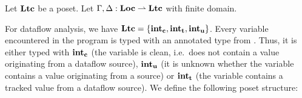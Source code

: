 Let $\textbf{Ltc}$ be a poset.
Let $\Gamma, \Delta: \textbf{Loc} \rightharpoonup \textbf{Ltc}$ with finite domain.

For dataflow analysis, we have $\textbf{Ltc} = \{\textbf{int}_\textbf{c}, \textbf{int}_\textbf{t}, \textbf{int}_\textbf{u}\}$.
Every variable encountered in the program is typed with an annotated type from \lattice.
Thus, it is either typed with $\textbf{int}_\textbf{c}{}$ (the variable
is clean, i.e.\ does not contain a value originating from a dataflow source), $\textbf{int}_\textbf{u}{}$
(it is unknown whether the variable contains a value originating from a source) or $\textbf{int}_\textbf{t}{}$
(the variable contains a tracked value from a dataflow source).
We define the following poset structure:
\begin{figure}[h]
    \centering
\end{figure}

